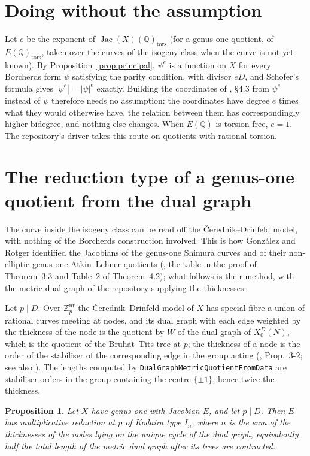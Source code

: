 \documentclass[11pt,reqno]{amsart}
\theoremstyle{plain}
\newtheorem{proposition}[theorem]{Proposition}
\theoremstyle{definition}
\DeclareMathOperator{\Jac}{Jac}
\newcommand{\Q}{\mathbb{Q}}
\newcommand{\Z}{\mathbb{Z}}
\begin{document}
\section{Doing without the assumption}

Let $e$ be the exponent of $\Jac(X)(\Q)_{\mathrm{tors}}$ (for a genus-one quotient, of
$E(\Q)_{\mathrm{tors}}$, taken over the curves of the isogeny class when the curve is not yet
known). By Proposition~\ref{prop:principal}, $\psi^e$ is a function on $X$ for every Borcherds
form $\psi$ satisfying the parity condition, with divisor $eD$, and Schofer's formula gives
$|\psi^e| = |\psi|^e$ exactly. Building the coordinates of \cite{GY}, \S4.3 from $\psi^e$ instead of
$\psi$ therefore needs no assumption: the coordinates have degree $e$ times what they would
otherwise have, the relation between them has correspondingly higher bidegree, and nothing else
changes. When $E(\Q)$ is torsion-free, $e = 1$. The repository's driver takes this route on
quotients with rational torsion.

\section{The reduction type of a genus-one quotient from the dual graph}

The curve inside the isogeny class can be read off the Čerednik--Drinfeld model, with nothing of the
Borcherds construction involved. This is how González and Rotger identified the Jacobians of the
genus-one Shimura curves and of their non-elliptic genus-one Atkin--Lehner quotients (\cite{GR},
the table in the proof of Theorem~3.3 and Table~2 of Theorem~4.2); what follows is their method,
with the metric dual graph of the repository supplying the thicknesses.

Let $p \mid D$. Over $\Z_p^{\mathrm{nr}}$ the Čerednik--Drinfeld model of $X$ has special fibre a
union of rational curves meeting at nodes, and its dual graph with each edge weighted by the
thickness of the node is the quotient by $W$ of the dual graph of $X_0^D(N)$, which is the quotient
of the Bruhat--Tits tree at $p$; the thickness of a node is the order of the stabiliser of the
corresponding edge in the group acting (\cite{Ku}, Prop.~3-2; see also \cite{BC}). The lengths
computed by \texttt{DualGraphMetricQuotientFromData} are stabiliser orders in the group containing
the centre $\{\pm 1\}$, hence twice the thickness.

\begin{proposition}\label{prop:kodaira}
Let $X$ have genus one with Jacobian $E$, and let $p \mid D$. Then $E$ has multiplicative reduction
at $p$ of Kodaira type $I_n$, where $n$ is the sum of the thicknesses of the nodes lying on the
unique cycle of the dual graph, equivalently half the total length of the metric dual graph after
its trees are contracted.
\end{proposition}
\end{document}
